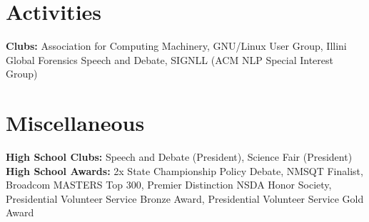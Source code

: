 \documentclass{article}
\begin{document}
\section{Activities}
\begin{itemize}[leftmargin=0.15in, label={}]
    \small{\item{
       \textbf{Clubs: }{Association for Computing Machinery, GNU/Linux User Group, Illini Global Forensics Speech and Debate, SIGNLL (ACM NLP Special Interest Group)}\\
     
    }}
 \end{itemize}
 \vspace{-10pt}
\section{Miscellaneous}
 \begin{itemize}[leftmargin=0.15in, label={}]
    \small{\item{
    
     \textbf{High School Clubs: }{Speech and Debate (President), Science Fair (President)} \\
     
     \textbf{High School Awards: }{2x State Championship Policy Debate, NMSQT Finalist, Broadcom MASTERS Top 300, Premier Distinction NSDA Honor Society, Presidential Volunteer Service Bronze Award, Presidential Volunteer Service Gold Award}\\

     
    }}
 \end{itemize}
\end{document}
